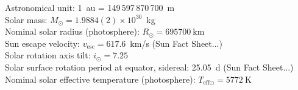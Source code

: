 Astronomical unit: 1~au = 149\,597\,870\,700~m \citep{USNO2015}\\ %
Solar mass: $M_\odot = 1.9884(2)\times10^{30}$~kg \citep{USNO2015}\\ %
Nominal solar radius (photosphere): $R_\odot = \SI{695700}{\km}$ \citep{Mamajek2015}\\ %
Sun escape velocity: $v_\text{esc} = 617.6$~km/s (Sun Fact Sheet...)\\
Solar rotation axis tilt: $i_\odot = 7.25$\textdegree{} \citep{USNO2015}\\ %
Solar surface rotation period at equator, sidereal: 25.05~d (Sun Fact Sheet...)\\
Nominal solar effective temperature (photosphere): $T_{\text{eff}\odot} = \SI{5772}{\kelvin}$ \citep{Mamajek2015}\\



